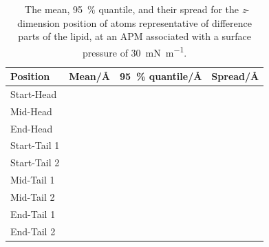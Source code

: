 \documentclass[amsmath,amssymb,twocolumn,superscriptaddress]{revtex4-1}
\begin{document}
\begin{table}[h]
\small
  \caption{\ The mean, \SI{95}{\percent} quantile, and their spread for the \emph{z}-dimension position of atoms representative of difference parts of the lipid, at an APM associated with a surface pressure of \SI{30}{\milli\newton\per\meter}.}
  \label{tab:spread}
  \begin{tabular*}{0.48\textwidth}{@{\extracolsep{\fill}}llll}
    \hline
    Position & Mean/\si{\angstrom} & \SI{95}{\percent} quantile/\si{\angstrom} & Spread/\si{\angstrom} \\
    \hline
    Start-Head &  &  &  \\
    Mid-Head &  &  &  \\
    End-Head &  &  &  \\
    \hline
    Start-Tail 1 &  &  &  \\
    Start-Tail 2 &  &  &  \\
    Mid-Tail 1 &  &  &  \\
    Mid-Tail 2 &  &  &  \\
    End-Tail 1 &  &  &  \\
    End-Tail 2 &  &  &  \\
    \hline
  \end{tabular*}
\end{table}
%
\end{document}
